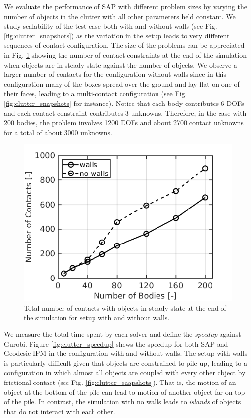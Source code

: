 We evaluate the performance of SAP with different problem sizes by varying the
number of objects in the clutter with all other parameters held constant. We
study scalability of the test case both with and without walls (see
Fig. \ref{fig:clutter_snapshots}) as the variation in the setup leads to very
different sequences of contact configuration. The size of the problems can be
appreciated in Fig. \ref{fig:clutter_num_contats} showing the number of contact
constraints at the end of the simulation when objects are in steady state
against the number of objects. We observe a larger number of contacts for the
configuration without walls since in this configuration many of the boxes spread
over the ground and lay flat on one of their faces, leading to a multi-contact
configuration (see Fig. \ref{fig:clutter_snapshots} for instance). Notice that
each body contributes 6 DOFs and each contact constraint contributes 3 unknowns.
Therefore, in the case with 200 bodies, the problem involves 1200 DOFs and about
2700 contact unknowns for a total of about 3000 unknowns.
\begin{figure}[!h]
	\centering
	\includegraphics[width=0.7\columnwidth]{figures/clutter/number_of_contacts.png}
	\caption{\label{fig:clutter_num_contats} 
	Total number of contacts with objects in steady state at the end of the
	simulation for setup with and without walls.}
\end{figure}

We measure the total time spent by each solver and define the \emph{speedup}
against Gurobi. Figure \ref{fig:clutter_speedup} shows the speedup for both
SAP and Geodesic IPM in the configuration with and without walls.
The setup with walls is particularly difficult given that objects are
constrained to pile up, leading to a configuration in which almost all objects
are coupled with every other object by frictional contact
(see Fig. \ref{fig:clutter_snapshots}). That is, the motion of an object at the
bottom of the pile can lead to motion of another object far on top of the pile.
In contrast, the simulation with no walls leads to \emph{islands} of objects
that do not interact with each other.

